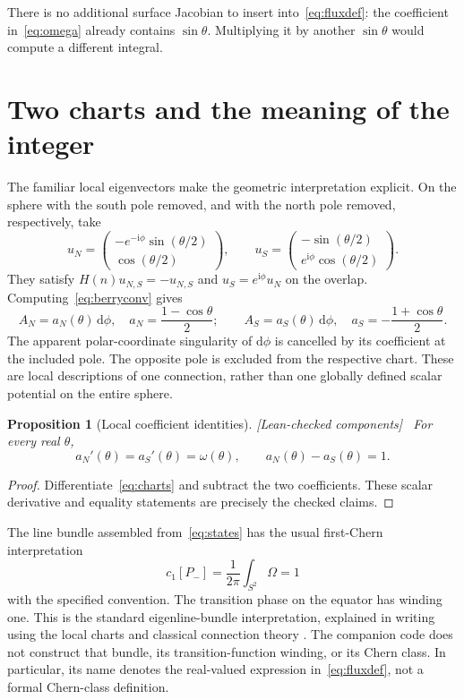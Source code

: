 \documentclass[11pt]{article}
\newtheorem{proposition}[theorem]{Proposition}
\theoremstyle{definition}\newtheorem{definition}[theorem]{Definition}
\theoremstyle{remark}\newtheorem{remark}[theorem]{Remark}
\newcommand{\ii}{\mathrm{i}}
\newcommand{\dd}{\mathrm{d}}
\newcommand{\checked}{\textnormal{\small[Lean-checked components]}\ }
\newcommand{\leanname}[1]{\texttt{\small\detokenize{#1}}}
\begin{document}
There is no additional surface Jacobian to insert into~\eqref{eq:fluxdef}: the coefficient in~\eqref{eq:omega} already contains $\sin\theta$. Multiplying it by another $\sin\theta$ would compute a different integral.

\section{Two charts and the meaning of the integer}
The familiar local eigenvectors make the geometric interpretation explicit. On the sphere with the south pole removed, and with the north pole removed, respectively, take
\begin{equation}\label{eq:states}
 u_N=\begin{pmatrix}-e^{-\ii\phi}\sin(\theta/2)\\\cos(\theta/2)\end{pmatrix},
 \qquad
 u_S=\begin{pmatrix}-\sin(\theta/2)\\e^{\ii\phi}\cos(\theta/2)\end{pmatrix}.
\end{equation}
They satisfy $H(n)u_{N,S}=-u_{N,S}$ and $u_S=e^{\ii\phi}u_N$ on the overlap. Computing~\eqref{eq:berryconv} gives
\begin{equation}\label{eq:charts}
 A_N=a_N(\theta)\,\dd\phi,\quad a_N=\frac{1-\cos\theta}{2};
 \qquad A_S=a_S(\theta)\,\dd\phi,\quad a_S=-\frac{1+\cos\theta}{2}.
\end{equation}
The apparent polar-coordinate singularity of $\dd\phi$ is cancelled by its coefficient at the included pole. The opposite pole is excluded from the respective chart. These are local descriptions of one connection, rather than one globally defined scalar potential on the entire sphere.

\begin{proposition}[Local coefficient identities]\label{prop:charts}\checked
For every real $\theta$,
\begin{equation}
 a_N'(\theta)=a_S'(\theta)=\omega(\theta),\qquad a_N(\theta)-a_S(\theta)=1.
\end{equation}
\end{proposition}
\begin{proof}
Differentiate~\eqref{eq:charts} and subtract the two coefficients. These scalar derivative and equality statements are precisely the checked claims.
\end{proof}
The line bundle assembled from~\eqref{eq:states} has the usual first-Chern interpretation
\begin{equation}\label{eq:chern}
 c_1[P_-]=\frac1{2\pi}\int_{S^2}\Omega=1
\end{equation}
with the specified convention. The transition phase on the equator has winding one. This is the standard eigenline-bundle interpretation, explained in writing using the local charts and classical connection theory \cite{simon,wuyang}. The companion code does not construct that bundle, its transition-function winding, or its Chern class. In particular, its name \leanname{normalizedFlux} denotes the real-valued expression in~\eqref{eq:fluxdef}, not a formal Chern-class definition.
\end{document}
